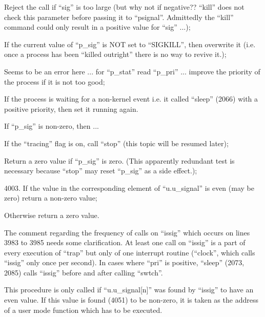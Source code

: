 \bd
\item[3966:] Reject the call if ``sig'' is too
 large (but why not if negative?? ``kill'' does not
check this parameter before passing it to ``psignal''.
Admittedly the ``kill'' command could only result in a
positive value for ``sig'' ...);

\item[3971:] If the current value of ``p\_sig''
 is NOT set to ``SIGKILL'', then
 overwrite it (i.e. once a process
 has been ``killed outright'' there
 is no way to revive it.);

\item[3973:] Seems to be an error here ... for
 ``p\_stat'' read ``p\_pri'' ... improve
 the priority of the process if it
 is not too good;

\item[3975:] If the process is waiting for a
 non-kernel event i.e. it called
 ``sleep'' (2066) with a positive
 priority, then set it running
 again.
\ed


\bd
\item[3997:] If ``p\_sig'' is non-zero, then ...

\item[3998:] If the ``tracing'' flag is on, call
 ``stop'' (this topic will be resumed later);

\item[4000:] Return a zero value if ``p\_sig'' is
 zero. (This apparently redundant
 test is necessary because ``stop''
 may reset ``p\_sig'' as a side
 effect.);

4003. If the value in the corresponding
 element of ``u.u\_signal'' is even
 (may be zero) return a non-zero
 value;

\item[4006:] Otherwise return a zero value.
\ed


The comment regarding the frequency of
calls on ``issig'' which occurs on lines
3983 to 3985 needs some clarification.
At least one call on ``issig'' is a part
of every execution of ``trap'' but only
of one interrupt routine (``clock'',
which calls ``issig'' only once per
second). In cases where ``pri'' is positive, ``sleep'' (2073, 2085) calls
``issig'' before and after calling
``swtch''.



This procedure is only called if
``u.u\_signal[n]'' was found by ``issig'' to
have an even value. If this value is
found (4051) to be non-zero, it is
taken as the address of a user mode
function which has to be executed.

